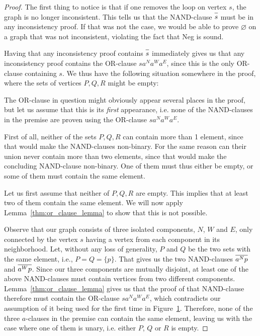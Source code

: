 \begin{proof}
The first thing to notice is that if one removes the loop on vertex $s$, the graph is no longer inconsistent.
This tells us that the NAND-clause $\ol{s}$ must be in any inconsistency proof.
If that was not the case, we would be able to prove $\varnothing$ on a graph that was not inconsistent, violating the fact that Neg is sound.

Having that any inconsistency proof contains $\ol{s}$ immediately gives us that any inconsistency proof contains the OR-clause $sa^Na^Wa^E$, since this is the only OR-clause containing $s$.
We thus have the following situation somewhere in the proof, where the sets of vertices $P,Q,R$ might be empty:\par
\begin{figure}[!h]
  \centering
  \begin{prooftree*}
    \Hypo{\dots}
    \Hypo{\dots}
    \Hypo{\dots}
  \end{prooftree*}
  \caption{}
  \label{fig:triple_double_proof_step}
\end{figure}
The OR-clause in question might obviously appear several places in the proof, but let us assume that this is its \textit{first} appearance, i.e. none of the NAND-clauses in the premise are proven using the OR-clause $sa^Na^Wa^E$.

First of all, neither of the sets $P,Q,R$ can contain more than 1 element, since that would make the NAND-clauses non-binary.
For the same reason can their union never contain more than two elements, since that would make the concluding NAND-clause non-binary.
One of them must thus either be empty, or some of them must contain the same element.

Let us first assume that neither of $P,Q,R$ are empty.
This implies that at least two of them contain the same element.
We will now apply Lemma~\ref{thm:or_clause_lemma} to show that this is not possible.

Observe that our graph consists of three isolated components, $N$, $W$ and $E$, only connected by the vertex $s$ having a vertex from each component in its neighborhood.
Let, without any loss of generality, $P$ and $Q$ be the two sets with the same element, i.e., $P = Q = \{p\}$.
That gives us the two NAND-clauses $\ol{a^Np}$ and $\ol{a^Wp}$.
Since our three components are mutually disjoint, at least one of the above NAND-clauses must contain vertices from two different components.
Lemma~\ref{thm:or_clause_lemma} gives us that the proof of that NAND-clause therefore must contain the OR-clause $sa^Na^Wa^E$, which contradicts our assumption of it being used for the first time in Figure~\ref{fig:triple_double_proof_step}.
Therefore, none of the three $a$-clauses in the premise can contain the same element, leaving us with the case where one of them is unary, i.e. either $P$, $Q$ or $R$ is empty.


\end{proof}
